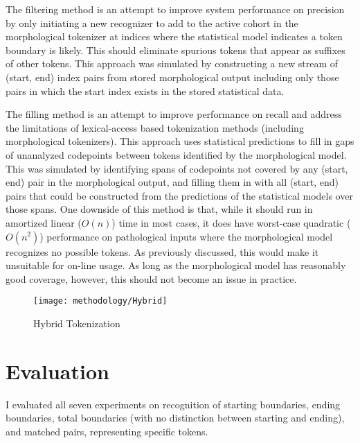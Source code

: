 The filtering method is an attempt to improve system performance on precision by only initiating a new recognizer to add to the active cohort in the morphological tokenizer at indices where the statistical model indicates a token boundary is likely. This should eliminate spurious tokens that appear as suffixes of other tokens. This approach was simulated by constructing a new stream of (start, end) index pairs from stored morphological output including only those pairs in which the start index exists in the stored statistical data.

The filling method is an attempt to improve performance on recall and address the limitations of lexical-access based tokenization methods (including morphological tokenizers). This approach uses statistical predictions to fill in gaps of unanalyzed codepoints between tokens identified by the morphological model. This was simulated by identifying spans of codepoints not covered by any (start, end) pair in the morphological output, and filling them in with all (start, end) pairs that could be constructed from the predictions of the statistical models over those spans. One downside of this method is that, while it should run in amortized linear ($O(n)$) time in most cases, it does have worst-case quadratic ($O(n^2)$) performance on pathological inputs where the morphological model recognizes no possible tokens. As previously discussed, this would make it unsuitable for on-line usage. As long as the morphological model has reasonably good coverage, however, this should not become an issue in practice.

\begin{figure}
	\texttt{[image: methodology/Hybrid]}
	\caption{Hybrid Tokenization}
	\label{hybriddiagram}
\end{figure}

\section{Evaluation}
I evaluated all seven experiments on recognition of starting boundaries, ending boundaries, total boundaries (with no distinction between starting and ending), and matched pairs, representing specific tokens.

